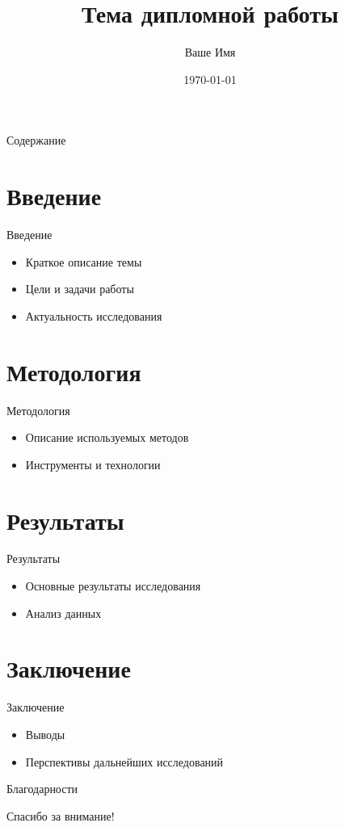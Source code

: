 \documentclass{beamer}
\title{Тема дипломной работы}
\author{Ваше Имя}
\institute{Ваш Университет}
\date{\today}
\begin{document}
\begin{frame}
    \titlepage
\end{frame}

\begin{frame}{Содержание}
    \tableofcontents
\end{frame}

\section{Введение}
\begin{frame}{Введение}
    \begin{itemize}
        \item Краткое описание темы
        \item Цели и задачи работы
        \item Актуальность исследования
    \end{itemize}
\end{frame}

\section{Методология}
\begin{frame}{Методология}
    \begin{itemize}
        \item Описание используемых методов
        \item Инструменты и технологии
    \end{itemize}
\end{frame}

\section{Результаты}
\begin{frame}{Результаты}
    \begin{itemize}
        \item Основные результаты исследования
        \item Анализ данных
    \end{itemize}
\end{frame}

\section{Заключение}
\begin{frame}{Заключение}
    \begin{itemize}
        \item Выводы
        \item Перспективы дальнейших исследований
    \end{itemize}
\end{frame}

\begin{frame}{Благодарности}
    \begin{center}
        Спасибо за внимание!
    \end{center}
\end{frame}
\end{document}
